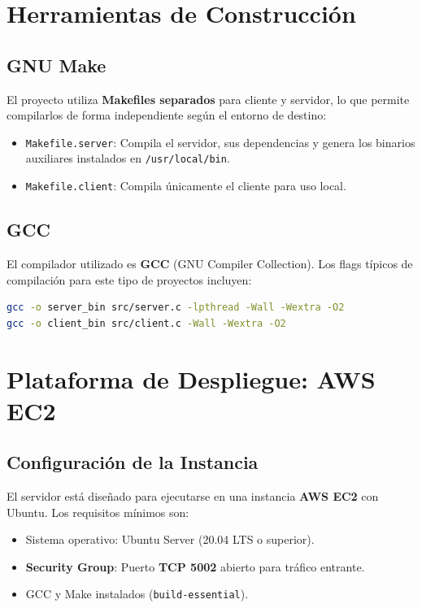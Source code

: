 \documentclass[12pt,a4paper]{report}
\begin{document}
\section{Herramientas de Construcción}

\subsection{GNU Make}

El proyecto utiliza \textbf{Makefiles separados} para cliente y servidor, lo que permite compilarlos de forma independiente según el entorno de destino:

\begin{itemize}[leftmargin=1.5em]
  \item \texttt{Makefile.server}: Compila el servidor, sus dependencias y genera los binarios auxiliares instalados en \texttt{/usr/local/bin}.
  \item \texttt{Makefile.client}: Compila únicamente el cliente para uso local.
\end{itemize}

\subsection{GCC}

El compilador utilizado es \textbf{GCC} (GNU Compiler Collection). Los flags típicos de compilación para este tipo de proyectos incluyen:

\begin{lstlisting}[style=bashstyle, language=bash, numbers=none]
gcc -o server_bin src/server.c -lpthread -Wall -Wextra -O2
gcc -o client_bin src/client.c -Wall -Wextra -O2
\end{lstlisting}

\section{Plataforma de Despliegue: AWS EC2}

\subsection{Configuración de la Instancia}

El servidor está diseñado para ejecutarse en una instancia \textbf{AWS EC2} con Ubuntu. Los requisitos mínimos son:

\begin{itemize}[leftmargin=1.5em]
  \item Sistema operativo: Ubuntu Server (20.04 LTS o superior).
  \item \textbf{Security Group}: Puerto \textbf{TCP 5002} abierto para tráfico entrante.
  \item GCC y Make instalados (\texttt{build-essential}).
\end{itemize}
\end{document}

